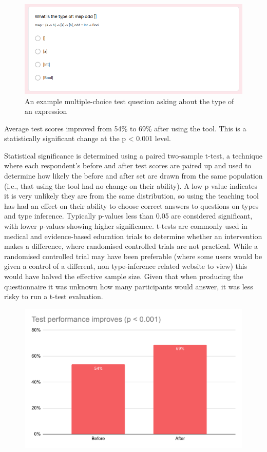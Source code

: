 \documentclass[a4paper,fleqn,oneside,12pt]{report}
\begin{document}
{\centering \begin{figure}[h!]
  \centering
  \includegraphics[width=0.9\linewidth]{images/image11.png}
  \caption{An example multiple-choice test question asking about the type of an expression}
\end{figure} \par}

Average test scores improved from 54\% to 69\% after using the tool. This is a statistically significant change at the p < 0.001 level.

Statistical significance is determined using a paired two-sample t-test, a technique where each respondent's before and after test scores are paired up and used to determine how likely the before and after set are drawn from the same population (i.e., that using the tool had no change on their ability). A low p value indicates it is very unlikely they are from the same distribution, so using the teaching tool has had an effect on their ability to choose correct answers to questions on types and type inference. Typically p-values less than 0.05 are considered significant, with lower p-values showing higher significance. t-tests are commonly used in medical and evidence-based education trials to determine whether an intervention makes a difference, where randomised controlled trials are not practical. While a randomised controlled trial may have been preferable (where some users would be given a control of a different, non type-inference related website to view) this would have halved the effective sample size. Given that when producing the questionnaire it was unknown how many participants would answer, it was less risky to run a t-test evaluation.

{\centering \begin{figure}[h!]
  \centering
  \includegraphics[width=0.85\linewidth]{images/image23.png}
  \label{figure:evaluation_testperformanceimproves}
\end{figure} \par}
\end{document}
